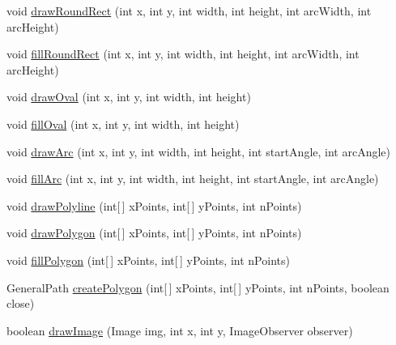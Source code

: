 \begin{DoxyCompactItemize}
\item 
void \mbox{\hyperlink{classorg_1_1jfree_1_1chart_1_1fx_1_1_f_x_graphics2_d_a7c7f99fc735267883a54b21253452af8}{draw\+Round\+Rect}} (int x, int y, int width, int height, int arc\+Width, int arc\+Height)
\item 
void \mbox{\hyperlink{classorg_1_1jfree_1_1chart_1_1fx_1_1_f_x_graphics2_d_af5708e944fee470811c783885c8092ab}{fill\+Round\+Rect}} (int x, int y, int width, int height, int arc\+Width, int arc\+Height)
\item 
void \mbox{\hyperlink{classorg_1_1jfree_1_1chart_1_1fx_1_1_f_x_graphics2_d_a34b661e65a0cd3461f3835becc3a5124}{draw\+Oval}} (int x, int y, int width, int height)
\item 
void \mbox{\hyperlink{classorg_1_1jfree_1_1chart_1_1fx_1_1_f_x_graphics2_d_af8298f32640cfd92c6c96038eba33b4e}{fill\+Oval}} (int x, int y, int width, int height)
\item 
void \mbox{\hyperlink{classorg_1_1jfree_1_1chart_1_1fx_1_1_f_x_graphics2_d_a4dafe532204cb14631cbb35e37539f20}{draw\+Arc}} (int x, int y, int width, int height, int start\+Angle, int arc\+Angle)
\item 
void \mbox{\hyperlink{classorg_1_1jfree_1_1chart_1_1fx_1_1_f_x_graphics2_d_a1edec17764148609b4b45c919b15c7fc}{fill\+Arc}} (int x, int y, int width, int height, int start\+Angle, int arc\+Angle)
\item 
void \mbox{\hyperlink{classorg_1_1jfree_1_1chart_1_1fx_1_1_f_x_graphics2_d_a7486187dae9100b255eec200d2463e4f}{draw\+Polyline}} (int\mbox{[}$\,$\mbox{]} x\+Points, int\mbox{[}$\,$\mbox{]} y\+Points, int n\+Points)
\item 
void \mbox{\hyperlink{classorg_1_1jfree_1_1chart_1_1fx_1_1_f_x_graphics2_d_ad12a26f3bd65b94a9275aea7dd7bf8e2}{draw\+Polygon}} (int\mbox{[}$\,$\mbox{]} x\+Points, int\mbox{[}$\,$\mbox{]} y\+Points, int n\+Points)
\item 
void \mbox{\hyperlink{classorg_1_1jfree_1_1chart_1_1fx_1_1_f_x_graphics2_d_a75c5d7ef1f60cee14eeac516ada2a7f5}{fill\+Polygon}} (int\mbox{[}$\,$\mbox{]} x\+Points, int\mbox{[}$\,$\mbox{]} y\+Points, int n\+Points)
\item 
General\+Path \mbox{\hyperlink{classorg_1_1jfree_1_1chart_1_1fx_1_1_f_x_graphics2_d_aa9257631031385e13fe0ca0fd1eccf32}{create\+Polygon}} (int\mbox{[}$\,$\mbox{]} x\+Points, int\mbox{[}$\,$\mbox{]} y\+Points, int n\+Points, boolean close)
\item 
boolean \mbox{\hyperlink{classorg_1_1jfree_1_1chart_1_1fx_1_1_f_x_graphics2_d_a9c74714f7626a89f4f35b3144da43335}{draw\+Image}} (Image img, int x, int y, Image\+Observer observer)

\end{DoxyCompactItemize}
